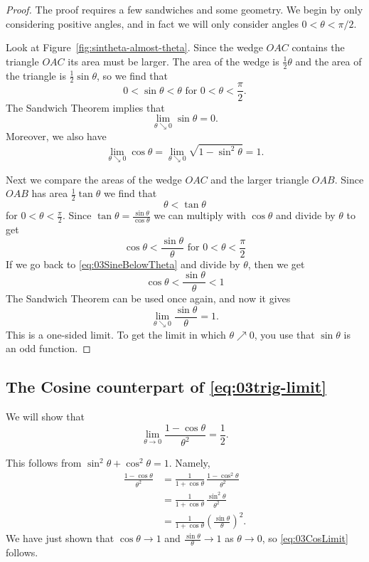 \begin{proof}
  The proof requires a few sandwiches and some geometry.  We begin by
  only considering positive angles, and in fact we will only consider
  angles $0<\theta<\pi/2$.

  Look at Figure~\ref{fig:sintheta-almost-theta}.   Since the wedge
  $OAC$ contains the triangle $OAC$ its area must be larger.  The area
  of the wedge is $\frac12\theta$ and the area of the triangle is
  $\frac12\sin \theta$, so we find that
  \begin{equation}\label{eq:03SineBelowTheta}
    0<\sin \theta <\theta \text{ for } 0<\theta<\frac\pi2.
  \end{equation}
  The Sandwich Theorem implies that
  \begin{equation}\label{eq:03limSineisZero}
    \lim_{\theta\searrow 0}\sin\theta = 0.
  \end{equation}
  Moreover, we also have
  \begin{equation}\label{eq:03limCosisOne}
    \lim_{\theta\searrow0}\cos\theta =
    \lim_{\theta\searrow0}\sqrt{1-\sin^2\theta} = 1.
  \end{equation}

  Next we compare the areas of the wedge $OAC$ and the larger triangle
  $OAB$.  Since $OAB$ has area $\frac12\tan \theta$ we find that
  \[
  \theta<\tan\theta
  \]
  for $0<\theta<\frac\pi2$.  Since $\tan\theta =
  \frac{\sin\theta}{\cos\theta}$ we can multiply with $\cos\theta$ and
  divide by $\theta$ to get
  \[
  \cos\theta < \frac{\sin\theta}{\theta} \text{ for }0<\theta<\frac\pi2
  \]
  If we go back to \eqref{eq:03SineBelowTheta} and divide by $\theta$, then we
  get
  \[
  \cos\theta < \frac{\sin\theta}{\theta} < 1
  \]
  The Sandwich Theorem can be used once again, and now it gives
  \[
  \lim_{\theta\searrow0} \frac{\sin\theta}\theta = 1.
  \]
  This is a one-sided limit.  To get the limit in which $\theta\nearrow 0$,
  you use that $\sin\theta$ is an odd function.
\end{proof}

\subsection{The Cosine counterpart of \eqref{eq:03trig-limit}} 
We will show that
\begin{equation}
  \lim_{\theta\to 0}\frac{1-\cos\theta}{\theta^2} = \frac12.
  \label{eq:03CosLimit}
\end{equation}

This follows from $\sin^2\theta+\cos^2\theta=1$.  Namely,
\begin{align*}
  \frac{1-\cos\theta}{\theta^2}
  &= \frac1{1+\cos\theta}\,\frac{1-\cos^2\theta}{\theta^2} \\
  &= \frac1{1+\cos\theta}\,\frac{\sin^2\theta}{\theta^2} \\
  &= \frac1{1+\cos\theta}\left( \frac{\sin\theta}{\theta} \right)^2.
\end{align*}
We have just shown that $\cos\theta\to1$ and $\frac{\sin\theta}\theta \to
1$ as $\theta\to0$, so \eqref{eq:03CosLimit} follows.

